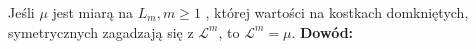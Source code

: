 \begin{lem}
    Jeśli $\mu$ jest miarą na $L_m, m \geq 1$ , której wartości na kostkach domkniętych, symetrycznych zagadzają się z $\mathcal{L}^m$, to $\mathcal{L}^m = \mu$.
    \newline
    \textbf{Dowód:} \citep[4.35]{Tworzewski}
\end{lem}